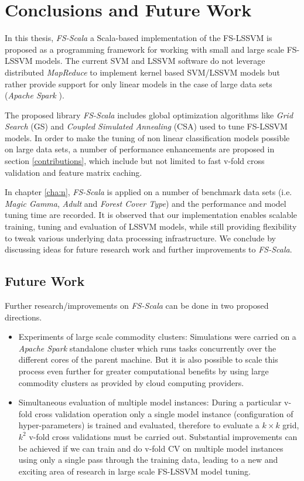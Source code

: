 \chapter{Conclusions and Future Work}\label{cha:conclusion}

In this thesis, \textit{FS-Scala} a Scala-based implementation of the FS-LSSVM is proposed as a programming framework for working with small and large scale FS-LSSVM models. The current SVM and LSSVM software do not leverage distributed \textit{MapReduce} to implement kernel based SVM/LSSVM models but rather provide support for only linear models in the case of large data sets (\textit{Apache Spark} \cite{Spark:2010}). 

The proposed library \textit{FS-Scala} includes global optimization algorithms like \textit{Grid Search} (GS) and \textit{Coupled Simulated Annealing} (CSA) used to tune FS-LSSVM models. In order to make the tuning of non linear classification models possible on large data sets, a number of performance enhancements are proposed in section \ref{contributions}, which include but not limited to fast v-fold cross validation and feature matrix caching.

In chapter \ref{cha:n}, \textit{FS-Scala} is applied on a number of benchmark data sets (i.e. \textit{Magic Gamma}, \textit{Adult} and \textit{Forest Cover Type}) and the performance and model tuning time are recorded. It is observed that our implementation enables scalable training, tuning and evaluation of LSSVM models, while still providing flexibility to tweak various underlying data processing infrastructure. We conclude by discussing ideas for future research work and further improvements to \textit{FS-Scala}. 

\section*{Future Work}

Further research/improvements on \textit{FS-Scala} can be done in two proposed directions.

\begin{itemize}
\item Experiments of large scale commodity clusters:
Simulations were carried on a \emph{Apache Spark} standalone cluster which runs tasks concurrently over the different cores of the parent machine. But it is also possible to scale this process even further for greater computational benefits by using large commodity clusters as provided by cloud computing providers.

\item Simultaneous evaluation of multiple model instances:
During a particular v-fold cross validation operation only a single model instance (configuration of hyper-parameters) is trained and  evaluated, therefore to evaluate a $k \times k$ grid, $k^2$ v-fold cross validations must be carried out. Substantial improvements can be achieved if we can train and do v-fold CV on multiple model instances using only a single pass through the training data, leading to a new and exciting area of research in large scale FS-LSSVM model tuning. 
\end{itemize}